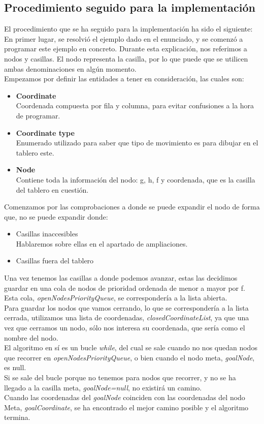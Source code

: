 \documentclass[es]{article}
\begin{document}
\subsection{Procedimiento seguido para la implementación}
El procedimiento que se ha seguido para la implementación ha sido el siguiente:\\
En primer lugar, se resolvió el ejemplo dado en el enunciado, y se comenzó a programar este ejemplo en concreto. Durante esta explicación, nos referimos a nodos y casillas. El nodo representa la casilla, por lo que puede que se utilicen ambas denominaciones en algún momento.\\
Empezamos por definir las entidades a tener en consideración, las cuales son:
\begin{itemize}
    \item \textbf{Coordinate}\\
    Coordenada compuesta por fila y columna, para evitar confusiones a la hora de programar.
    \item \textbf{Coordinate type}\\
    Enumerado utilizado para saber que tipo de movimiento es para dibujar en el tablero este.
    \item \textbf{Node}\\
    Contiene toda la información del nodo: g, h, f y coordenada, que es la casilla del tablero en cuestión.
\end{itemize}
Comenzamos por las comprobaciones a donde se puede expandir el nodo de forma que, no se puede expandir donde:
\begin{itemize}
    \item Casillas inaccesibles\\
    Hablaremos sobre ellas en el apartado de ampliaciones.
    \item Casillas fuera del tablero
\end{itemize}
Una vez tenemos las casillas a donde podemos avanzar, estas las decidimos guardar en una cola de nodos de prioridad ordenada de menor a mayor por f. Esta cola, \textit{openNodesPriorityQueue}, se correspondería a la lista abierta.\\ Para guardar los nodos que vamos cerrando, lo que se correspondería a la lista cerrada, utilizamos una lista de coordenadas, \textit{closedCoordinateList}, ya que una vez que cerramos un nodo, sólo nos interesa su coordenada, que sería como el nombre del nodo.\\
El algoritmo en sí es un bucle\textit{ while}, del cual se sale cuando no nos quedan nodos que recorrer en \textit{openNodesPriorityQueue}, o bien cuando el nodo meta, \textit{goalNode}, es null.\\
Si se sale del bucle porque no tenemos para nodos que recorrer, y no se ha llegado a la casilla meta, \textit{goalNode=null}, no existirá un camino.\\
Cuando las coordenadas del \textit{goalNode} coinciden con las coordenadas del nodo Meta, \textit{goalCoordinate}, se ha encontrado el mejor camino posible y el algoritmo termina. 
\end{document}
